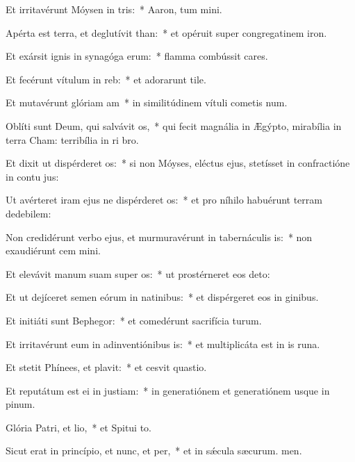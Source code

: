 \item Et irritavérunt Móysen in tris:~* Aaron, tum mini.
\item Apérta est terra, et deglutívit than:~* et opéruit super congregatinem iron.
\item Et exársit ignis in synagóga erum:~* flamma combússit cares.
\item Et fecérunt vítulum in reb:~* et adorarunt tile.
\item Et mutavérunt glóriam am~* in similitúdinem vítuli cometis num.
\item Oblíti sunt Deum, qui salvávit os,~* qui fecit magnália in Ægýpto, mirabília in terra Cham: terribília in ri bro.
\item Et dixit ut dispérderet os:~* si non Móyses, eléctus ejus, stetísset in confractióne in contu jus:
\item Ut avérteret iram ejus ne dispérderet os:~* et pro níhilo habuérunt terram dedebilem:
\item Non credidérunt verbo ejus, et murmuravérunt in tabernáculis is:~* non exaudiérunt cem mini.
\item Et elevávit manum suam super os:~* ut prostérneret eos  deto:
\item Et ut dejíceret semen eórum in natinibus:~* et dispérgeret eos in ginibus.
\item Et initiáti sunt Bephegor:~* et comedérunt sacrifícia turum.
\item Et irritavérunt eum in adinventiónibus is:~* et multiplicáta est in is runa.
\item Et stetit Phínees, et plavit:~* et cesvit quastio.
\item Et reputátum est ei in justiam:~* in generatiónem et generatiónem usque in pinum.
\item Glória Patri, et lio,~* et Spitui to.
\item Sicut erat in princípio, et nunc, et per,~* et in sǽcula sæcurum. men.
